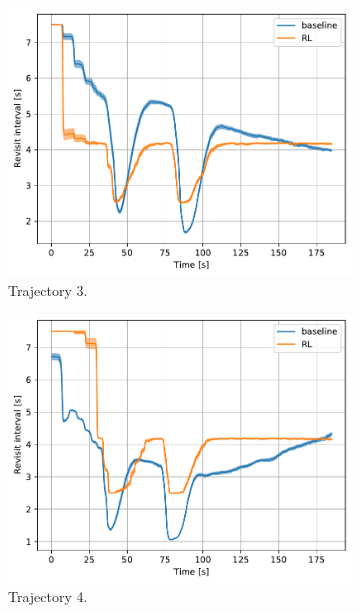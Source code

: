 \documentclass[english, 12pt, a4paper, elec, utf8, a-1b, online]{aaltothesis}
\begin{document}
\begin{figure}[htb]
    \hfill
    \begin{subfigure}[b]{0.45\textwidth}
        \centering
        \includegraphics[width=\linewidth]{figures/benchmark/Simulations/revisit_intervals_2.pdf}
        \caption{Trajectory 3.}
        \label{fig:TL_T3}
    \end{subfigure}
    \hfill
    \begin{subfigure}[b]{0.45\textwidth}
        \centering
        \includegraphics[width=\linewidth]{figures/benchmark/Simulations/revisit_intervals_3.pdf}
        \caption{Trajectory 4.}
        \label{fig:TL_T4}
    \end{subfigure}
    \hfill
    \begin{subfigure}[b]{0.45\textwidth}

\end{subfigure}
\end{figure}
\end{document}
